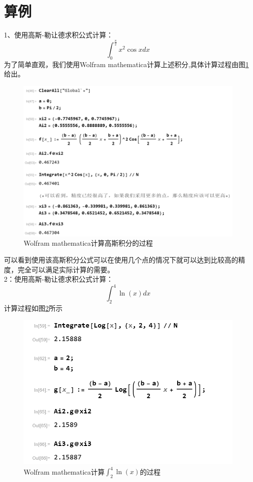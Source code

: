 \documentclass{article}                          %
\numberwithin{equation}{subsection}              %
\begin{document}
\section{算例}
1、使用高斯-勒让德求积公式计算：
\begin{equation}\label{key}
\int_{0}^{\frac{\pi}{2}}x^2 \cos x dx
\end{equation}
为了简单直观，我们使用Wolfram mathematica计算上述积分,具体计算过程由图\ref{fig1}给出。\\
\begin{figure}
	\centering
	\includegraphics[width=\linewidth]{高斯积分公式的计算.png}
	\caption{Wolfram mathematica计算高斯积分的过程}
	\label{fig1}
\end{figure}
可以看到使用该高斯积分公式可以在使用几个点的情况下就可以达到比较高的精度，完全可以满足实际计算的需要。\\
2：使用高斯-勒让德求积公式计算：
\begin{equation}\label{key}
\int_{2}^{4}\ln(x) dx
\end{equation}
计算过程如图\ref{fig2}所示
\begin{figure}[h]
		\centering
	\includegraphics[width=\linewidth]{lnx.png}
	\caption{Wolfram mathematica计算$ \int_{2}^{4}\ln(x) $的过程}
	\label{fig2}
\end{figure}
\end{document}
